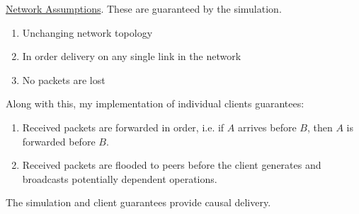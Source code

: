 \documentclass[12pt,a4paper,twoside,openright]{report}
\begin{document}
		\underline{Network Assumptions}. These are guaranteed by the simulation.
		\begin{enumerate}
			\item Unchanging network topology
			\item In order delivery on any single link in the network
			\item No packets are lost
		\end{enumerate}
		
		Along with this, my implementation of individual clients guarantees:
		\begin{enumerate}
			\item Received packets are forwarded in order, i.e. if $A$ arrives before $B$, then $A$ is forwarded before $B$.
			\item Received packets are flooded to peers before the client generates and broadcasts potentially dependent operations.
		\end{enumerate} 
		
		The simulation and client guarantees provide causal delivery.
		
\end{document}
